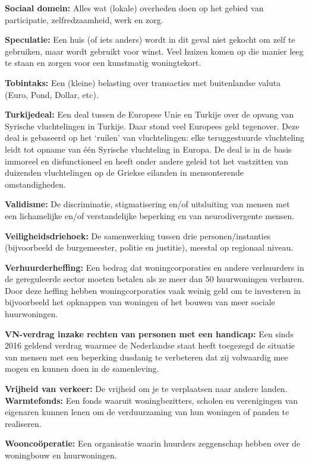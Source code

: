 \textbf{Sociaal domein:} Alles wat (lokale) overheden doen op het gebied
van participatie, zelfredzaamheid, werk en zorg.

\textbf{Speculatie:} Een huis (of iets anders) wordt in dit geval niet
gekocht om zelf te gebruiken, maar wordt gebruikt voor winst. Veel
huizen komen op die manier leeg te staan en zorgen voor een kunstmatig
woningtekort.

\textbf{Tobintaks:} Een (kleine) belasting over transacties met
buitenlandse valuta (Euro, Pond, Dollar, etc).

\textbf{Turkijedeal:} Een deal tussen de Europese Unie en Turkije over
de opvang van Syrische vluchtelingen in Turkije. Daar stond veel
Europees geld tegenover. Deze deal is gebaseerd op het `ruilen' van
vluchtelingen: elke teruggestuurde vluchteling leidt tot opname van één
Syrische vluchteling in Europa. De deal is in de basis immoreel en
disfunctioneel en heeft onder andere geleid tot het vastzitten van
duizenden vluchtelingen op de Griekse eilanden in mensonterende
omstandigheden.

\textbf{Validisme:} De discriminatie, stigmatisering en/of uitsluiting
van mensen met een lichamelijke en/of verstandelijke beperking en van
neurodivergente mensen.

\textbf{Veiligheidsdriehoek:} De samenwerking tussen drie
personen/instanties (bijvoorbeeld de burgemeester, politie en justitie),
meestal op regionaal niveau.

\textbf{Verhuurderheffing:} Een bedrag dat woningcorporaties en andere
verhuurders in de gereguleerde sector moeten betalen als ze meer dan 50
huurwoningen verhuren. Door deze heffing hebben woningcorporaties vaak
weinig geld om te investeren in bijvoorbeeld het opknappen van woningen
of het bouwen van meer sociale huurwoningen.

\textbf{VN-verdrag inzake rechten van personen met een handicap:} Een
sinds 2016 geldend verdrag waarmee de Nederlandse staat heeft toegezegd
de situatie van mensen met een beperking dusdanig te verbeteren dat zij
volwaardig mee mogen en kunnen doen in de samenleving.

\textbf{Vrijheid van verkeer:} De vrijheid om je te verplaatsen naar
andere landen.\textbf{\hfill\break
Warmtefonds:} Een fonds waaruit woningbezitters, scholen en verenigingen
van eigenaren kunnen lenen om de verduurzaming van hun woningen of
panden te realiseren.

\textbf{Wooncoöperatie:} Een organisatie waarin huurders zeggenschap
hebben over de woningbouw en huurwoningen.


